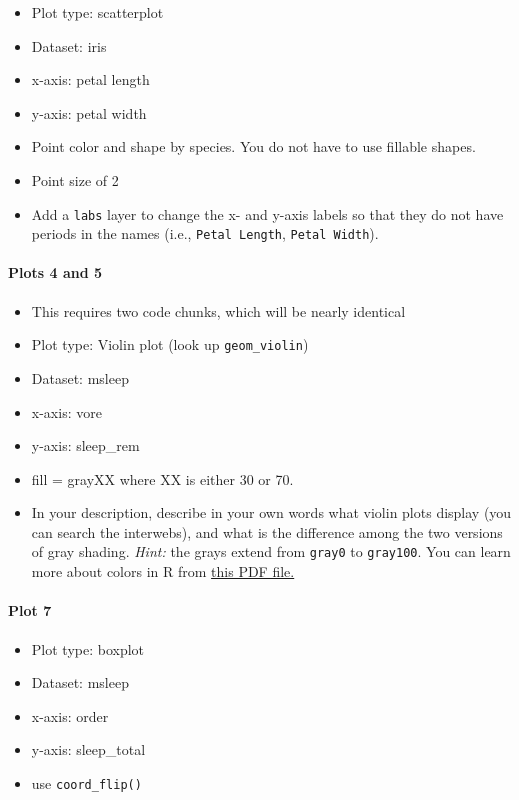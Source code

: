 \documentclass[]{article}
\providecommand{\tightlist}{%
  \setlength{\itemsep}{0pt}\setlength{\parskip}{0pt}}
\let\oldparagraph\paragraph
\renewcommand{\paragraph}[1]{\oldparagraph{#1}\mbox{}}
\begin{document}
\begin{itemize}
\tightlist
\item
  Plot type: scatterplot
\item
  Dataset: iris
\item
  x-axis: petal length
\item
  y-axis: petal width
\item
  Point color and shape by species. You do not have to use fillable
  shapes.
\item
  Point size of 2
\item
  Add a \texttt{labs} layer to change the x- and y-axis labels so that
  they do not have periods in the names (i.e., \texttt{Petal\ Length},
  \texttt{Petal\ Width}).
\end{itemize}

\hypertarget{plots-4-and-5}{%
\paragraph{Plots 4 and 5}\label{plots-4-and-5}}

\begin{itemize}
\item
  This requires two code chunks, which will be nearly identical
\item
  Plot type: Violin plot (look up \texttt{geom\_violin})
\item
  Dataset: msleep
\item
  x-axis: vore
\item
  y-axis: sleep\_rem
\item
  fill = grayXX where XX is either 30 or 70.
\item
  In your description, describe in your own words what violin plots
  display (you can search the interwebs), and what is the difference
  among the two versions of gray shading. \emph{Hint:} the grays extend
  from \texttt{gray0} to \texttt{gray100}. You can learn more about
  colors in R from
  \href{https://www.nceas.ucsb.edu/~frazier/RSpatialGuides/colorPaletteCheatsheet.pdf}{this
  PDF file.}
\end{itemize}

\hypertarget{plot-7}{%
\paragraph{Plot 7}\label{plot-7}}

\begin{itemize}
\tightlist
\item
  Plot type: boxplot
\item
  Dataset: msleep
\item
  x-axis: order
\item
  y-axis: sleep\_total
\item
  use \texttt{coord\_flip()}
\end{itemize}
\end{document}
